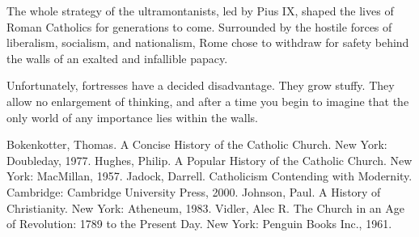 The whole strategy of the ultramontanists, led by Pius IX, shaped the lives of Roman Catholics for
generations to come. Surrounded by the hostile forces of liberalism, socialism, and nationalism,
Rome chose to withdraw for safety behind the walls of an exalted and infallible papacy.

Unfortunately, fortresses have a decided disadvantage. They grow stuffy. They allow no enlargement
of thinking, and after a time you begin to imagine that the only world of any importance lies within
the walls.

\begin{readinglist}
\entry Bokenkotter, Thomas. A Concise History of the Catholic Church. New York: Doubleday, 1977.
\entry Hughes, Philip. A Popular History of the Catholic Church. New York: MacMillan, 1957.
\entry *Jadock, Darrell. Catholicism Contending with Modernity. Cambridge: Cambridge University
  Press, 2000.
\entry Johnson, Paul. A History of Christianity. New York: Atheneum, 1983.
\entry Vidler, Alec R. The Church in an Age of Revolution: 1789 to the Present Day. New York:
  Penguin Books Inc., 1961.
\end{readinglist}
